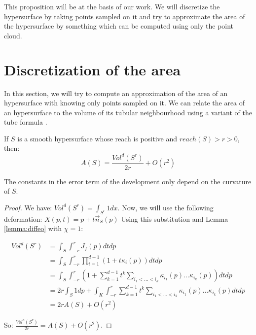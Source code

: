 This proposition will be at the basis of our work. We will discretize the
hypersurface by taking points sampled on it and try to approximate the area of
the hypersurface by something which can be computed using only the point cloud.

\section{Discretization of the area}

In this section, we will try to compute an approximation of the area of an
hypersurface with knowing only points sampled on it. We can relate the area of
an hypersurface to the volume of its tubular neighbourhood using a variant of
the tube formula \cite{weyl1939volume}.

\begin{proposition}
    \label{prop:comp-offset-area}
    If $ S $ is a smooth hypersurface whose reach is positive and $ reach(S) > r
    > 0 $, then:
    \begin{equation}
        A(S) = \frac{Vol^d(S^r)}{2r} + O(r^2)
    \end{equation}

    The constants in the error term of the development only depend on the curvature
    of $ S $.
\end{proposition}

\begin{proof}
    We have: $ Vol^d(S^r) = \int_{S^r} 1 dx $. Now, we will use the
    following deformation: $ X(p, t) = p + t \vec{n}_{S}(p) $ Using this
    substitution and Lemma \ref{lemma:diffeo} with $ \chi = 1 $:

    \begin{align*}
        Vol^d(S^r) &= \int_S \int_{-r}^r J_f(p) dt dp \\
        &= \int_S \int_{-r}^r \prod_{i=1}^{d-1} (1 + t \kappa_i(p)) dt dp \\
        &= \int_S \int_{-r}^r \left( 1 + \sum_{k=1}^{d-1} t^k \sum_{i_1 < \ldots
                < i_k} \kappa_{i_1}(p) \ldots \kappa_{i_k}(p) \right) dt dp \\
        &= 2r \int_S 1 dp + \int_K \int_{-r}^r \sum_{k=1}^{d-1} t^k \sum_{i_1 < \ldots < i_k} \kappa_{i_1}(p) \ldots \kappa_{i_k}(p) dt dp \\
        &= 2r A(S) + O(r^2)
    \end{align*}

    So: $ \frac{Vol^d(S^r)}{2r} = A(S) + O(r^2) $.
\end{proof}

